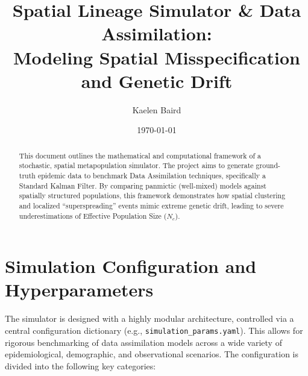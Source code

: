 \documentclass[12pt]{article}
\title{Spatial Lineage Simulator \& Data Assimilation: \\ \large Modeling Spatial Misspecification and Genetic Drift}
\author{Kaelen Baird}
\date{\today}
\begin{document}
\maketitle

\begin{abstract}
This document outlines the mathematical and computational framework of a stochastic, spatial metapopulation simulator. The project aims to generate ground-truth epidemic data to benchmark Data Assimilation techniques, specifically a Standard Kalman Filter. By comparing panmictic (well-mixed) models against spatially structured populations, this framework demonstrates how spatial clustering and localized ``superspreading'' events mimic extreme genetic drift, leading to severe underestimations of Effective Population Size ($N_e$).
\end{abstract}

\section{Simulation Configuration and Hyperparameters}
The simulator is designed with a highly modular architecture, controlled via a central configuration dictionary (e.g., \texttt{simulation\_params.yaml}). This allows for rigorous benchmarking of data assimilation models across a wide variety of epidemiological, demographic, and observational scenarios. The configuration is divided into the following key categories:
\end{document}
